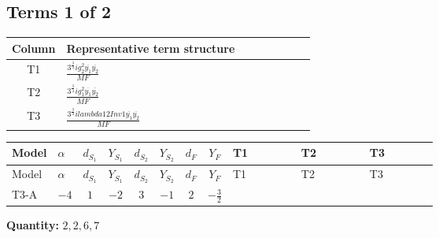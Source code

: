 \documentclass[8pt]{article}
\begin{document}
\begin{landscape}
\subsection*{Terms 1 of 2}
\begin{center}
\begin{tabular}{@{}c >{\raggedright\arraybackslash}p{0.82\linewidth}@{}}
\toprule
Column & Representative term structure \\
\midrule
T1 & \(\displaystyle \frac{3^{\frac{3}{4}} i g_{2}^{2} \overline{y_{1}} \overline{y_{2}}}{MF}\) \\
\midrule
T2 & \(\displaystyle \frac{3^{\frac{3}{4}} i g_{1}^{2} \overline{y_{1}} \overline{y_{2}}}{MF}\) \\
\midrule
T3 & \(\displaystyle \frac{3^{\frac{3}{4}} i lambda12Inv1 \overline{y_{1}} \overline{y_{2}}}{MF}\) \\
\midrule
\bottomrule
\end{tabular}
\end{center}
\smallskip
\tiny
\begin{longtable}{@{}llcccccc >{\raggedright\arraybackslash}p{0.21\linewidth} >{\raggedright\arraybackslash}p{0.21\linewidth} >{\raggedright\arraybackslash}p{0.21\linewidth}@{}}
\toprule
Model & $\alpha$ & $d_{S_1}$ & $Y_{S_1}$ & $d_{S_2}$ & $Y_{S_2}$ & $d_F$ & $Y_F$ & T1 & T2 & T3 \\
\midrule
\endfirsthead
\toprule
Model & $\alpha$ & $d_{S_1}$ & $Y_{S_1}$ & $d_{S_2}$ & $Y_{S_2}$ & $d_F$ & $Y_F$ & T1 & T2 & T3 \\
\midrule
\endhead
T3-A & $-4$ & $1$ & $-2$ & $3$ & $-1$ & $2$ & $-\frac{3}{2}$ & \scriptsize\adjustbox{max width=\linewidth}{$\begin{gathered} - \frac{17 \cdot 3^{\frac{3}{4}} i g_{2}^{2} \overline{y_{1}} \overline{y_{2}}}{24 MF}\end{gathered}$} & \scriptsize\adjustbox{max width=\linewidth}{$\begin{gathered} - \frac{9 \cdot 3^{\frac{3}{4}} i g_{1}^{2} \overline{y_{1}} \overline{y_{2}}}{8 MF}\end{gathered}$} & \scriptsize\adjustbox{max width=\linewidth}{$\begin{gathered} - \frac{3^{\frac{3}{4}} i lambda12Inv1 \overline{y_{1}} \overline{y_{2}}}{6 MF}\end{gathered}$} \\
\midrule
\bottomrule
\end{longtable}
\clearpage
\noindent\textbf{Quantity: }$\mathrm{2,2,6,7}$\par\smallskip

\end{landscape}
\end{document}
